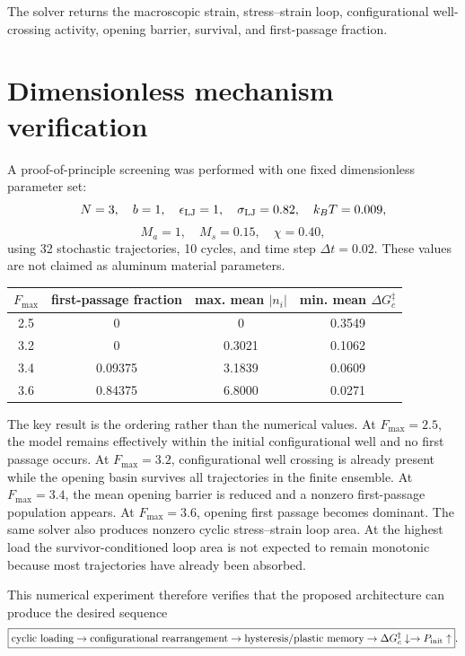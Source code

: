 \documentclass[11pt]{article}
\begin{document}
The solver returns the macroscopic strain, stress--strain loop, configurational well-crossing activity, opening barrier, survival, and first-passage fraction.

\section{Dimensionless mechanism verification}
A proof-of-principle screening was performed with one fixed dimensionless parameter set:
\begin{equation}
 N=3,\quad b=1,\quad
 \epsilon_{\rm LJ}=1,\quad
 \sigma_{\rm LJ}=0.82,\quad
 k_BT=0.009,
\end{equation}
\begin{equation}
 M_a=1,\quad M_s=0.15,\quad \chi=0.40,
\end{equation}
using 32 stochastic trajectories, 10 cycles, and time step $\Delta t=0.02$. These values are not claimed as aluminum material parameters.

\begin{center}
\begin{tabular}{cccc}
\toprule
$F_{\max}$ & first-passage fraction & max. mean $|n_i|$ & min. mean $\Delta G_c^\ddagger$ \\
\midrule
2.5 & 0 & 0 & 0.3549 \\
3.2 & 0 & 0.3021 & 0.1062 \\
3.4 & 0.09375 & 3.1839 & 0.0609 \\
3.6 & 0.84375 & 6.8000 & 0.0271 \\
\bottomrule
\end{tabular}
\end{center}

The key result is the ordering rather than the numerical values. At $F_{\max}=2.5$, the model remains effectively within the initial configurational well and no first passage occurs. At $F_{\max}=3.2$, configurational well crossing is already present while the opening basin survives all trajectories in the finite ensemble. At $F_{\max}=3.4$, the mean opening barrier is reduced and a nonzero first-passage population appears. At $F_{\max}=3.6$, opening first passage becomes dominant. The same solver also produces nonzero cyclic stress--strain loop area. At the highest load the survivor-conditioned loop area is not expected to remain monotonic because most trajectories have already been absorbed.

This numerical experiment therefore verifies that the proposed architecture can produce the desired sequence
\begin{equation}
 \boxed{
 \text{cyclic loading}
 \rightarrow
 \text{configurational rearrangement}
 \rightarrow
 \text{hysteresis/plastic memory}
 \rightarrow
 \Delta G_c^\ddagger\downarrow
 \rightarrow
 P_{\rm init}\uparrow
 }.
\end{equation}
\end{document}
